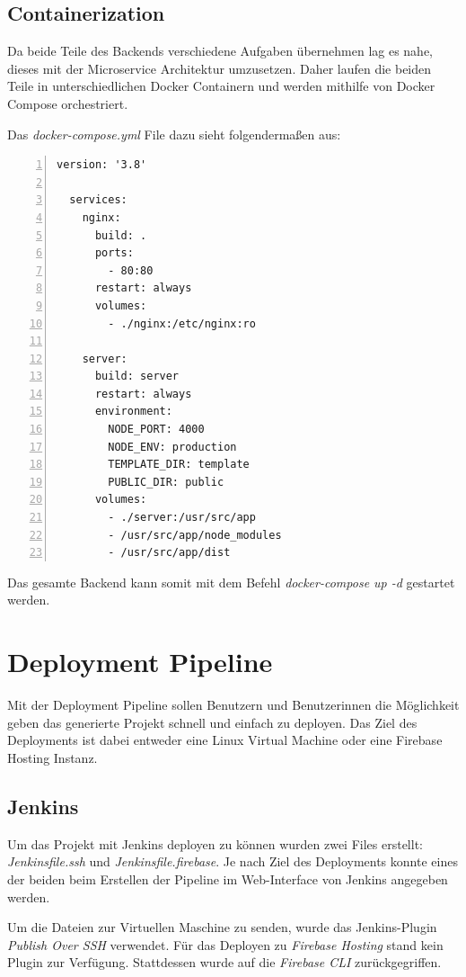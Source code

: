 \subsection{Containerization}
Da beide Teile des Backends verschiedene Aufgaben übernehmen lag es nahe, dieses mit der Microservice
Architektur umzusetzen.
Daher laufen die beiden Teile in unterschiedlichen Docker Containern und werden mithilfe
von Docker Compose orchestriert.


Das \textit{docker-compose.yml} File dazu sieht folgendermaßen aus:

\begin{lstlisting}[numbers=left]
  version: '3.8'

  services:
    nginx:
      build: .
      ports:
        - 80:80
      restart: always
      volumes:
        - ./nginx:/etc/nginx:ro

    server:
      build: server
      restart: always
      environment:
        NODE_PORT: 4000
        NODE_ENV: production
        TEMPLATE_DIR: template
        PUBLIC_DIR: public
      volumes:
        - ./server:/usr/src/app
        - /usr/src/app/node_modules
        - /usr/src/app/dist
\end{lstlisting}

Das gesamte Backend kann somit mit dem Befehl \textit{docker-compose up -d} gestartet werden.

\section{Deployment Pipeline}
Mit der Deployment Pipeline sollen Benutzern und Benutzerinnen die Möglichkeit geben das generierte Projekt schnell
und einfach zu deployen.
Das Ziel des Deployments ist dabei entweder eine Linux Virtual Machine oder eine Firebase Hosting Instanz.

\subsection{Jenkins}
Um das Projekt mit Jenkins deployen zu können wurden zwei Files erstellt: \textit{Jenkinsfile.ssh} und
\textit{Jenkinsfile.firebase}.
Je nach Ziel des Deployments konnte eines der beiden beim Erstellen der Pipeline im Web-Interface von Jenkins
angegeben werden.

Um die Dateien zur Virtuellen Maschine zu senden, wurde das Jenkins-Plugin \textit{Publish Over SSH}
verwendet.
Für das Deployen zu \textit{Firebase Hosting} stand kein Plugin zur Verfügung.
Stattdessen wurde auf die \textit{Firebase CLI} zurückgegriffen.

